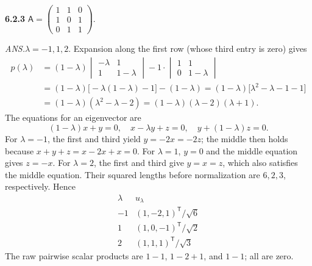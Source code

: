 \par\bigskip
\noindent\textbf{6.2.3}\quad
$\mathsf{A}=\begin{pmatrix}1&1&0\\1&0&1\\0&1&1\end{pmatrix}$.
\par\nobreak\hfill\emph{ANS.}\enspace $\lambda=-1,1,2$.
\solution
Expansion along the first row (whose third entry is zero) gives
\begin{align*}
p(\lambda)
&=(1-\lambda)\begin{vmatrix}-\lambda&1\\1&1-\lambda\end{vmatrix}
-1\cdot\begin{vmatrix}1&1\\0&1-\lambda\end{vmatrix}\\
&=(1-\lambda)\bigl[-\lambda(1-\lambda)-1\bigr]-(1-\lambda)
=(1-\lambda)\bigl[\lambda^2-\lambda-1-1\bigr]\\
&=(1-\lambda)(\lambda^2-\lambda-2)
=(1-\lambda)(\lambda-2)(\lambda+1).
\end{align*}
The equations for an eigenvector are
\[
(1-\lambda)x+y=0,\quad x-\lambda y+z=0,\quad
 y+(1-\lambda)z=0.
\]
For $\lambda=-1$, the first and third yield $y=-2x=-2z$; the middle
then holds because $x+y+z=x-2x+x=0$.
For $\lambda=1$, $y=0$ and the middle equation gives $z=-x$.
For $\lambda=2$, the first and third give $y=x=z$, which also satisfies
the middle equation. Their squared lengths before normalization are
$6,2,3$, respectively. Hence
\[
\boxed{\begin{array}{c|c}
\lambda&u_\lambda\\\hline
-1&(1,-2,1)^{\mathsf T}/\sqrt6\\
1&(1,0,-1)^{\mathsf T}/\sqrt2\\
2&(1,1,1)^{\mathsf T}/\sqrt3
\end{array}}
\]
The raw pairwise scalar products are $1-1$, $1-2+1$, and $1-1$;
all are zero.

